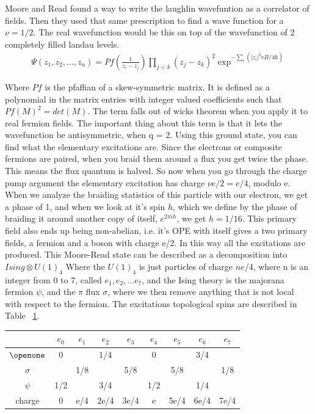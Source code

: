Moore and Read found a way to write the laughlin wavefuntion as a correlator of fields. Then they used that same prescription to find a wave function for a $\nu=1/2$. The real wavefunction would be this on top of the wavefunction of 2 completely filled landau levels. 
\begin{align}
\Psi(z_1,z_2,...,z_n) = Pf(\frac{1}{z_i-z_j})\prod_{j<k}(z_j-z_k)^2 \exp^{-\sum_i(|z_i|^2eB/4\hbar)}
\end{align}

Where $Pf$ is the pfaffian of a skew-symmetric matrix. It is defined as a polynomial in the matrix entries with integer valued coefficients such that $Pf(M)^2=det(M)$.  The term falls out of wicks theorem when you apply it to real fermion fields. The important thing about this term is that it lets the wavefunction be antisymmetric, when q = 2. Using this ground state, you can find what the elementary excitations are. Since the electrons or composite fermions are paired, when you braid them around a flux you get twice the phase. This means the flux quantum is halved. So now when you go through the charge pump argument the elementary excitation has charge $\nu e/2 = e/4$, modulo e. When we analyze the braiding statistics of this particle with our electron, we get a phase of 1, and when we look at it's spin $h$, which we define by the phase of braiding it around another copy of itself, $e^{2\pi i h}$, we get $h=1/16$. This primary field also ends up being non-abelian, i.e. it's OPE with itself gives a two primary fields, a fermion and a boson with charge e/2. In this way all the excitations are produced. This Moore-Read state can be described as a decomposition into $Ising \otimes U(1)_4$ Where the $U(1)_4$ is just particles of charge $ne/4$, where n is an integer from 0 to 7, called $e_1,e_2,...e_7$, and the Ising theory is the majorana fermion $\psi$, and the $\pi$ flux $\sigma$, where we then remove anything that is not local with respect to the fermion. The excitations topological spins are described in Table ~\ref{tab:Pfaff}.
\begin{table}[h]
	\centering
	\begin{tabular}{|c|c|c|c|c|c|c|c|c|}
		\hline
		&$e_0$& $e_1$ & $e_2$ & $e_3$ & $e_4$& $e_5$& $e_6$& $e_7$\\
		\hline
		$\openone$ & 0 && 1/4 & & 0 && 3/4 & \\
		\hline
		$\sigma $ && 1/8 && 5/8 && 5/8 && 1/8 \\
		\hline
		$\psi$ & 1/2 && 3/4 & & 1/2 && 1/4 &\\
		\hline
		charge & 0 &e/4& 2e/4 & 3e/4 & e & 5e/4& 6e/4 & 7e/4\\
		\hline
	\end{tabular}
	\label{tab:Pfaff}
\end{table}

